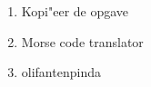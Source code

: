 \begin{enumerate}
  \item Kopi"eer de opgave
  \item Morse code translator
  \item olifantenpinda
\end{enumerate}